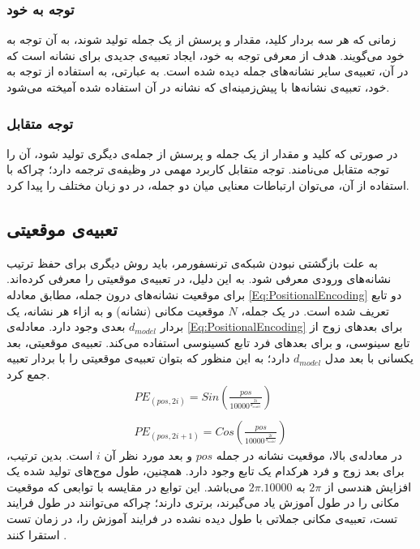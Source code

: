 \subsubsection{توجه به خود}
زمانی که هر سه بردار کلید، مقدار و پرسش از یک جمله تولید شوند، به آن توجه به خود می‌گویند. هدف از معرفی توجه به خود، ایجاد تعبیه‌ی جدیدی برای نشانه است که در آن، تعبیه‌ی سایر نشانه‌های جمله دیده شده است. به عبارتی، به استفاده از توجه به خود، تعبیه‌ی نشانه‌ها با پیش‌زمینه‌ای که نشانه در آن استفاده شده آمیخته می‌شود.
\subsubsection{توجه متقابل}
در صورتی که کلید و مقدار از یک جمله و پرسش از جمله‌ی دیگری تولید شود، آن را توجه متقابل می‌نامند. توجه متقابل کاربرد مهمی در وظیفه‌ی ترجمه دارد؛ چراکه با استفاده از آن، می‌توان ارتباطات معنایی میان دو جمله، در دو زبان مختلف را پیدا کرد.

\subsection{تعبیه‌ی موقعیتی}
به علت بازگشتی نبودن شبکه‌ی ترنسفورمر، باید روش دیگری برای حفظ ترتیب نشانه‌های ورودی معرفی شود. به این دلیل، در \cite{transformer} تعبیه‌ی موقعیتی را معرفی کرده‌اند. برای موقعیت نشانه‌های درون جمله، مطابق معادله \ref{Eq:PositionalEncoding} دو تابع تعریف شده است. در یک جمله، $N$ موقعیت مکانی (نشانه) و به ازاء هر نشانه، یک بردار $d_{model}$ بعدی وجود دارد.  معادله‌ی \ref{Eq:PositionalEncoding} برای بعدهای زوج از تابع سینوسی،‌ و برای بعدهای فرد تابع کسینوسی استفاده می‌کند. تعبیه‌ی موقعیتی، بعد یکسانی با بعد مدل $d_{model}$ دارد؛ به این منظور که بتوان تعبیه‌ی موقعیتی را با بردار تعبیه جمع کرد.
\begin{equation}
	\begin{array}{l}
		PE_(pos,2i) = Sin(\frac{pos}{10000^{\frac{2i}{d_{model}}}})\\\\
		PE_(pos,2i+1) = Cos(\frac{pos}{10000^{\frac{2i}{d_{model}}}})
	\end{array}
	\label{Eq:PositionalEncoding}
\end{equation}
در معادله‌ی بالا، موقعیت نشانه در جمله $pos$  و بعد مورد نظر آن  $i$  است. بدین ترتیب، برای بعد زوج و فرد هرکدام یک تابع وجود دارد. همچنین، طول موج‌های تولید شده یک افزایش هندسی از $2\pi$ به $2\pi . 10000$ می‌باشد. این توابع در مقایسه با توابعی که موقعیت مکانی را در طول آموزش یاد می‌گیرند، برتری دارند؛ چراکه می‌توانند در طول فرایند تست، تعبیه‌ی مکانی جملاتی با طول دیده نشده در فرایند آموزش را، در زمان تست استقرا کنند  \cite{transformer}.
